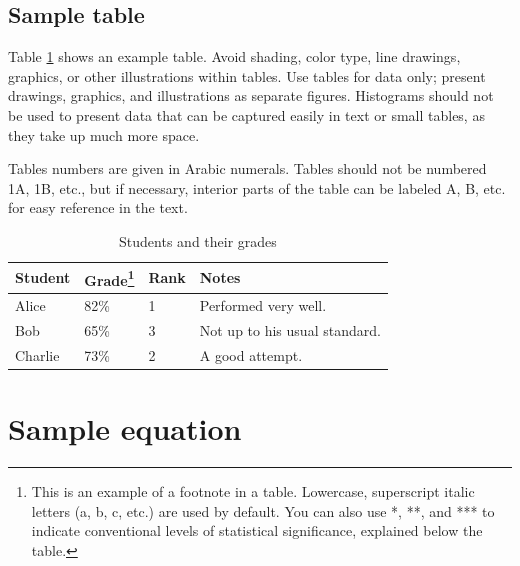 \documentclass[10pt,twocolumn,twoside,lineno]{gsajnl}
\begin{document}

\subsection{Sample table}

Table \ref{tab:shape-functions} shows an example table. Avoid shading, color type, line drawings, graphics, or other illustrations within tables. Use tables for data only; present drawings, graphics, and illustrations as separate figures. Histograms should not be used to present data that can be captured easily in text or small tables, as they take up much more space.

Tables numbers are given in Arabic numerals. Tables should not be numbered 1A, 1B, etc., but if necessary, interior parts of the table can be labeled A, B, etc. for easy reference in the text.

\begin{table}[p]
\centering
\caption{Students and their grades}
\begin{tableminipage}{\textwidth}
\begin{tabularx}{\textwidth}{@{}XXXX@{}}
\hline
{\bf Student} & {\bf Grade}\footnote{This is an example of a footnote in a table. Lowercase, superscript italic letters (a, b, c, etc.) are used by default. You can also use *, **, and *** to indicate conventional levels of statistical significance, explained below the table.} & {\bf Rank} & {\bf Notes} \\
\hline
Alice & 82\% & 1 & Performed very well.\\
Bob & 65\% & 3 & Not up to his usual standard.\\
Charlie & 73\% & 2 & A good attempt.\\
\hline
\end{tabularx}
  \label{tab:shape-functions}
\end{tableminipage}
\end{table}

\section{Sample equation}
\end{document}
